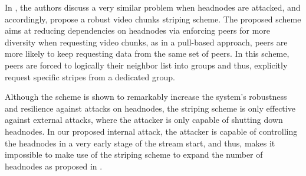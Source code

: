 In \cite{nguyen2014resilience}, the authors discuss a very similar problem when headnodes are attacked, and accordingly, propose a robust video chunks striping scheme. 
The proposed scheme aims at reducing dependencies on headnodes via enforcing peers for more diversity when requesting video chunks, as in a pull-based approach, peers are more likely to keep requesting data from the same set of peers.
In this scheme, peers are forced to logically their neighbor list into groups and thus, explicitly request specific stripes from a dedicated group.

Although the scheme is shown to remarkably increase the system's robustness and resilience against attacks on headnodes, the striping scheme is only effective against external attacks, where the attacker is only capable of shutting down headnodes.
In our proposed internal attack, the attacker is capable of controlling the headnodes in a very early stage of the stream start, and thus, makes it impossible to make use of the striping scheme to expand the number of headnodes as proposed in \cite{nguyen2014resilience}.



